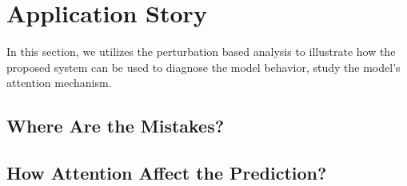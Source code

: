 \section{Application Story}
\label{sec:caseStudy}


In this section, we utilizes the perturbation based analysis
to illustrate how the proposed system can be used
to diagnose the model behavior, study the model's attention mechanism.

\subsection{Where Are the Mistakes?}


\subsection{How Attention Affect the Prediction?}



